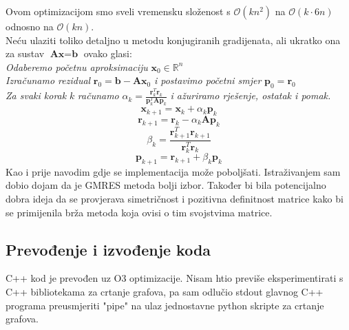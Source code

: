 \documentclass[zavrsnirad]{../fer}
\begin{document}
Ovom optimizacijom smo sveli vremensku složenost s 
$\mathcal{O}(k n^2)$ na $\mathcal{O}(k \cdot 6n)$ odnosno na $\mathcal{O}(k n)$.
\bigskip
\\
Neću ulaziti toliko detaljno u metodu konjugiranih gradijenata, 
ali ukratko ona za sustav $\textbf{A}\textbf{x} = \textbf{b}$ ovako glasi: 
\\ 
\textit{Odaberemo početnu aproksimaciju} $\textbf{x}_0 \in \mathbb{R}^n$
\\ 
\textit{Izračunamo rezidual} $\textbf{r}_0 = \textbf{b} - \textbf{A}\textbf{x}_0$
\textit{i postavimo početni smjer} $\textbf{p}_0 = \textbf{r}_0$ 
\\ 
\textit{Za svaki korak} $k$ \textit{računamo} $\alpha_k = 
\frac{\textbf{r}_k^T\textbf{r}_k}{\textbf{p}_k^T\textbf{A}\textbf{p}_k}$ 
\textit{i ažuriramo rješenje, ostatak i pomak.} 
$$\textbf{x}_{k+1} = \textbf{x}_k + \alpha_k \textbf{p}_k$$
$$\textbf{r}_{k + 1} = \textbf{r}_k - \alpha_k \textbf{A} \textbf{p}_k$$ 
$$\beta_k = \frac{\textbf{r}_{k + 1}^T\textbf{r}_{k + 1}}{\textbf{r}_k^T\textbf{r}_k} $$
$$\textbf{p}_{k + 1} = \textbf{r}_{k + 1} + \beta_k  \textbf{p}_k$$
Kao i prije navodim gdje se implementacija može poboljšati. Istraživanjem 
sam dobio dojam da je GMRES metoda bolji izbor. Također bi bila
potencijalno dobra 
ideja da se provjerava simetričnost i pozitivna definitnost matrice 
kako bi se primijenila brža metoda koja ovisi o tim svojstvima 
matrice.

\subsection{Prevođenje i izvođenje koda}
C++ kod je prevođen uz O3 optimizacije. Nisam htio 
previše eksperimentirati s C++ bibliotekama za crtanje grafova, pa 
sam odlučio stdout glavnog C++ programa preusmjeriti "pipe" na ulaz 
jednostavne python skripte za crtanje grafova.

\end{document}
